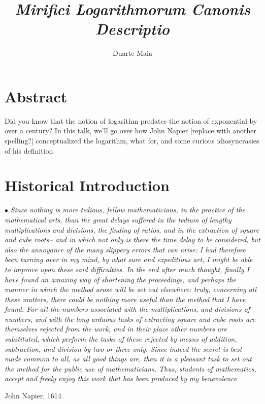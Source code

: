 \documentclass{article}
\title{\textit{Mirifici Logarithmorum Canonis Descriptio}}
\author{Duarte Maia}
\newcommand\point[1]{\noindent \hspace{\labelsep} $\bullet$ #1 \smallskip}
\begin{document}
\maketitle

\section{Abstract}

Did you know that the notion of logarithm predates the notion of exponential by over a century? In this talk, we'll go over how John Napier [replace with another spelling?] conceptualized the logarithm, what for, and some curious idiosyncrasies of his definition.

\section{Historical Introduction}

\point{\textit{Since nothing is more tedious, fellow mathematicians, in the practice of the mathematical arts, than the great delays suffered in the tedium of lengthy multiplications and divisions, the finding of ratios, and in the extraction of square and cube roots– and in which not only is there the time delay to be considered, but also the annoyance of the many slippery errors that can arise: I had therefore been turning over in my mind, by what sure and expeditious art, I might be able to improve upon these said difficulties. In the end after much thought, finally I have found an amazing way of shortening the proceedings, and perhaps the manner in which the method arose will be set out elsewhere: truly, concerning all these matters, there could be nothing more useful than the method that I have found. For all the numbers associated with the multiplications, and divisions of numbers, and with the long arduous tasks of extracting square and cube roots are themselves rejected from the work, and in their place other numbers are substituted, which perform the tasks of these rejected by means of addition, subtraction, and division by two or three only. Since indeed the secret is best made common to all, as all good things are, then it is a pleasant task to set out the method for the public use of mathematicians. Thus, students of mathematics, accept and freely enjoy this work that has been produced by my benevolence}

\hfill John Napier, 1614.}

\end{document}
